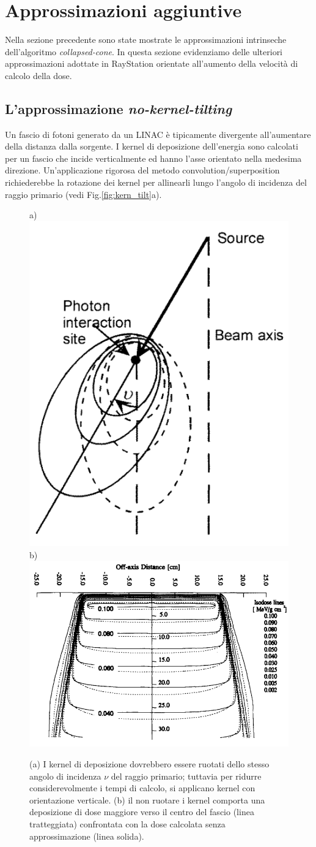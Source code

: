 {\section{Approssimazioni aggiuntive}
Nella sezione precedente sono state mostrate le approssimazioni intrinseche dell'algoritmo \textit{collapsed-cone}. In questa sezione evidenziamo delle ulteriori approssimazioni adottate in RayStation orientate all'aumento della velocità di calcolo della dose.

\subsection{L'approssimazione \textit{no-kernel-tilting}}
Un fascio di fotoni generato da un LINAC è tipicamente divergente all'aumentare della distanza dalla sorgente. I kernel di deposizione dell'energia sono calcolati per un fascio che incide verticalmente ed hanno l'asse orientato nella medesima direzione. Un'applicazione rigorosa del metodo convolution/superposition richiederebbe la rotazione dei kernel per allinearli lungo l'angolo di incidenza del raggio primario (vedi Fig.\ref{fig:kern_tilt}a).\\
\begin{figure}
\centering
a)\includegraphics[width=.3\textwidth]{./cap1/kern_tilt.png}
b)\includegraphics[width=.55\textwidth]{./cap1/kern_tilt_b.png}
\caption{(a) I kernel di deposizione dovrebbero essere ruotati dello stesso angolo di incidenza $\nu$ del raggio primario; tuttavia per ridurre considerevolmente i tempi di calcolo, si applicano kernel con orientazione verticale. (b) il non ruotare i kernel comporta una deposizione di dose maggiore verso il centro del fascio (linea tratteggiata) confrontata con la dose calcolata senza approssimazione (linea solida).}

\end{figure}}
